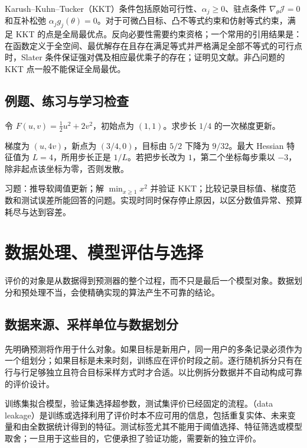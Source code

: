 \documentclass[UTF8,12pt,a4paper,fontset=fandol]{ctexbook}
\begin{document}
Karush--Kuhn--Tucker（KKT）条件包括原始可行性、$\alpha_j\geq0$、驻点条件 $\nabla_\theta\mathcal J=0$ 和互补松弛 $\alpha_jg_j(\theta)=0$。对于可微凸目标、凸不等式约束和仿射等式约束，满足 KKT 的点是全局最优点。反向必要性需要约束资格；一个常用的引用结果是：在函数定义于全空间、最优解存在且存在满足等式并严格满足全部不等式的可行点时，Slater 条件保证强对偶及相应最优乘子的存在；证明见文献\cite[第5章]{ml-convex}。非凸问题的 KKT 点一般不能保证全局最优。

\section{例题、练习与学习检查}

\begin{example}[步长决定更新行为]
令 $F(u,v)=\tfrac12u^2+2v^2$，初始点为 $(1,1)$。求步长 $1/4$ 的一次梯度更新。
\end{example}
\begin{solve}
梯度为 $(u,4v)$，新点为 $(3/4,0)$，目标由 $5/2$ 下降为 $9/32$。最大 Hessian 特征值为 $L=4$，所用步长正是 $1/L$。若把步长改为 $1$，第二个坐标每步乘以 $-3$，除非起点该坐标为零，否则发散。
\end{solve}

习题：推导软阈值更新；解 $\min_{x\geq1}x^2$ 并验证 KKT；比较记录目标值、梯度范数和测试误差所能回答的问题。实现时同时保存停止原因，以区分数值异常、预算耗尽与达到容差。

\chapter{数据处理、模型评估与选择}
\label{chap:ml-evaluation}

评价的对象是从数据得到预测器的整个过程，而不只是最后一个模型对象。数据划分和预处理不当，会使精确实现的算法产生不可靠的结论。

\section{数据来源、采样单位与数据划分}

先明确预测将作用于什么对象。如果目标是新用户，同一用户的多条记录必须作为一个组划分；如果目标是未来时刻，训练应在评价时段之前。逐行随机拆分只有在行与行足够独立且符合目标采样方式时才合适。以比例拆分数据并不自动构成可靠的评价设计。

训练集拟合模型，验证集选择超参数，测试集评价已经固定的流程。（data leakage）是训练或选择利用了评价时本不应可用的信息，包括重复实体、未来变量和由全数据统计得到的特征。测试标签尤其不能用于阈值选择、特征筛选或模型取舍；一旦用于这些目的，它便承担了验证功能，需要新的独立评价。
\end{document}
